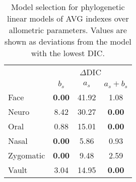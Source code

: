 \begin{table}[ht]
  \centering
  \caption{Model selection for phylogenetic linear models of AVG indexes over allometric parameters. Values are shown as deviations from the model with the lowest DIC. \label{tab:dic_allo_im}}
  \begin{tabular}{lccc}
    \hline
    & \multicolumn{3}{c}{\small{$\Delta$DIC}} \\
    & $b_s$ & $a_s$ & $a_s + b_s$ \\ 
    \hline
    Face & {\bf 0.00} & 41.92 & 1.08 \\ 
    Neuro & 8.42 & 30.27 & {\bf 0.00} \\ 
    Oral & 0.88 & 15.01 & {\bf 0.00} \\ 
    Nasal & {\bf 0.00} & 5.86 & 0.93 \\ 
    Zygomatic & {\bf 0.00} & 9.48 & 2.59 \\ 
    Vault & 3.04 & 14.95 & {\bf 0.00} \\ 
    \hline
  \end{tabular}
\end{table}